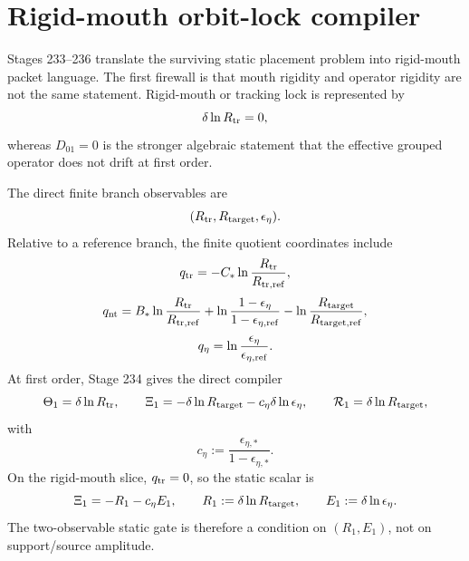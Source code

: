 
\section{Rigid-mouth orbit-lock compiler}
\label{sec:part07_same_charge_rigid_mouth:rigid-mouth-orbit-lock-compiler}

Stages 233--236 translate the surviving static placement problem into rigid-mouth packet language.  The first firewall is that mouth rigidity and operator rigidity are not the same statement.  Rigid-mouth or tracking lock is represented by
\begin{equation}
\label{eq:part07-tracking-lock}
\delta\ln R_{\rm tr}=0,
\end{equation}
whereas \(D_{01}=0\) is the stronger algebraic statement that the effective grouped operator does not drift at first order.

The direct finite branch observables are
\begin{equation}
\label{eq:part07-direct-observables}
(R_{\rm tr},R_{\rm target},\epsilon_\eta).
\end{equation}
Relative to a reference branch, the finite quotient coordinates include
\begin{equation}
\label{eq:part07-qtr-qnt-qeta-finite}
q_{\rm tr}=-C_*\ln\frac{R_{\rm tr}}{R_{\rm tr,ref}},
\end{equation}
\begin{equation}
\label{eq:part07-qnt-finite}
q_{\rm nt}=B_*\ln\frac{R_{\rm tr}}{R_{\rm tr,ref}}
+
\ln\frac{1-\epsilon_\eta}{1-\epsilon_{\eta,\rm ref}}
-
\ln\frac{R_{\rm target}}{R_{\rm target,ref}},
\end{equation}
\begin{equation}
\label{eq:part07-qeta-finite}
q_\eta=\ln\frac{\epsilon_\eta}{\epsilon_{\eta,\rm ref}}.
\end{equation}
At first order, Stage 234 gives the direct compiler
\begin{equation}
\label{eq:part07-direct-first-order}
\Theta_1=\delta\ln R_{\rm tr},
\qquad
\Xi_1=-\delta\ln R_{\rm target}-c_\eta\delta\ln\epsilon_\eta,
\qquad
\mathcal R_1=\delta\ln R_{\rm target},
\end{equation}
with
\begin{equation}
\label{eq:part07-ceta}
c_\eta:=\frac{\epsilon_{\eta,*}}{1-\epsilon_{\eta,*}}.
\end{equation}
On the rigid-mouth slice, \(q_{\rm tr}=0\), so the static scalar is
\begin{equation}
\label{eq:part07-rigid-static-scalar}
\Xi_1=-R_1-c_\eta E_1,
\qquad
R_1:=\delta\ln R_{\rm target},
\qquad
E_1:=\delta\ln\epsilon_\eta.
\end{equation}
The two-observable static gate is therefore a condition on \((R_1,E_1)\), not on support/source amplitude.

